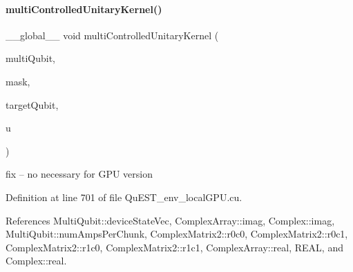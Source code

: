 \paragraph{\texorpdfstring{multi\+Controlled\+Unitary\+Kernel()}{multiControlledUnitaryKernel()}}
{\footnotesize\ttfamily \+\_\+\+\_\+global\+\_\+\+\_\+ void multi\+Controlled\+Unitary\+Kernel (\begin{DoxyParamCaption}\item[{\mbox{\hyperlink{structMultiQubit}{Multi\+Qubit}}}]{multi\+Qubit,  }\item[{long long int}]{mask,  }\item[{const int}]{target\+Qubit,  }\item[{\mbox{\hyperlink{structComplexMatrix2}{Complex\+Matrix2}}}]{u }\end{DoxyParamCaption})}

fix -- no necessary for G\+PU version 

Definition at line 701 of file Qu\+E\+S\+T\+\_\+env\+\_\+local\+G\+P\+U.\+cu.



References Multi\+Qubit\+::device\+State\+Vec, Complex\+Array\+::imag, Complex\+::imag, Multi\+Qubit\+::num\+Amps\+Per\+Chunk, Complex\+Matrix2\+::r0c0, Complex\+Matrix2\+::r0c1, Complex\+Matrix2\+::r1c0, Complex\+Matrix2\+::r1c1, Complex\+Array\+::real, R\+E\+AL, and Complex\+::real.



